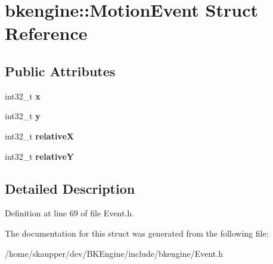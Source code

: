 \hypertarget{structbkengine_1_1MotionEvent}{}\section{bkengine\+:\+:Motion\+Event Struct Reference}
\label{structbkengine_1_1MotionEvent}
\subsection*{Public Attributes}
\begin{DoxyCompactItemize}
\item 
\mbox{\label{structbkengine_1_1MotionEvent_a5749d1019df479279f419b053ce7e5de}} 
int32\+\_\+t {\bfseries x}
\item 
\mbox{\label{structbkengine_1_1MotionEvent_a31f55a0d9f09e02aef18999daeec9df6}} 
int32\+\_\+t {\bfseries y}
\item 
\mbox{\label{structbkengine_1_1MotionEvent_a40920cd91d98141c395c500edb8cca02}} 
int32\+\_\+t {\bfseries relativeX}
\item 
\mbox{\label{structbkengine_1_1MotionEvent_a43240adbb50090b7cb2b500cda093a1a}} 
int32\+\_\+t {\bfseries relativeY}
\end{DoxyCompactItemize}


\subsection{Detailed Description}


Definition at line 69 of file Event.\+h.



The documentation for this struct was generated from the following file\+:\begin{DoxyCompactItemize}
\item 
/home/skaupper/dev/\+B\+K\+Engine/include/bkengine/Event.\+h\end{DoxyCompactItemize}
